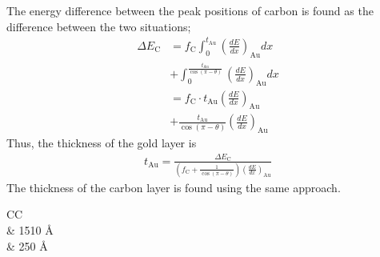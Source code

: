 The energy difference between the peak positions of carbon is found as the difference between the two situations;
\begin{align}
\Delta E_\mathrm{C} &= f_\mathrm{C} \int_0^{t_{\mathrm{Au}}}{\left(\frac{dE}{dx}\right)_{\mathrm{Au}}dx} \nonumber
\\ &+ \int_0^{\frac{t_\mathrm{Au}}{\cos(\pi-\theta)}}{\left(\frac{dE}{dx}\right)_{\mathrm{Au}}dx} \nonumber
\\ &= f_\mathrm{C} \cdot t_{\mathrm{Au}} \left( \frac{dE}{dx}\right)_{\mathrm{Au}} \nonumber
\\ &+ \frac{t_{\mathrm{Au}}}{\cos(\pi-\theta)} \left(\frac{dE}{dx}\right)_{\mathrm{Au}}
\end{align}
Thus, the thickness of the gold layer is
\begin{align}
t_{\mathrm{Au}} = \frac{\Delta E_\mathrm{C}}{ \left( f_\mathrm{C} + \frac{1}{\cos(\pi-\theta)} \right) \left( \frac{dE}{dx} \right)_{\mathrm{Au}} }
\end{align}
The thickness of the carbon layer is found using the same approach. 

\begin{table}[h]
\centering
\caption{Thickness of the target layers determined from change in energy.}
\begin{tabular}{CC}
\toprule
{}\\
\midrule
{} & 1510  \; \AA \\
 & 250  \; \AA \\
\bottomrule
\end{tabular}

\label{tab_thickness}
\end{table}




